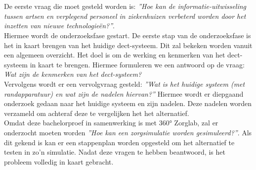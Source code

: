 \section{}%
\label{sec:prep}%
De eerste vraag die moet gesteld worden is: \textit{''Hoe kan de informatie-uitwisseling tussen artsen en verplegend personeel in ziekenhuizen verbeterd worden door het inzetten van nieuwe technologieën?''}.\\ 

Hiermee wordt de onderzoeksfase gestart. De eerste stap van de onderzoeksfase is het in kaart brengen van het huidige \gls{dect}-systeem. Dit zal bekeken worden vanuit een algemeen overzicht. Het doel is om de werking en kenmerken van het \gls{dect}-systeem in kaart te brengen. Hiermee formuleren we een antwoord op de vraag: \textit{Wat zijn de kenmerken van het \gls{dect}-systeem?}\\
Vervolgens wordt er een vervolgvraag gesteld: \textit{''Wat is het huidige systeem (met randapparatuur) en wat zijn de nadelen hiervan?''} Hiermee wordt er diepgaand onderzoek gedaan naar het huidige systeem en zijn nadelen. Deze nadelen worden verzameld om achteraf deze te vergelijken het het alternatief.\\ Omdat deze bachelorproef in samenwerking is met 360° Zorglab, zal er onderzocht moeten worden \textit{''Hoe kan een zorgsimulatie worden gesimuleerd?''}. Als dit gekend is kan er een stappenplan worden opgesteld om het alternatief te testen in zo'n simulatie.
Nadat deze vragen te hebben beantwoord, is het probleem volledig in kaart gebracht.\\



